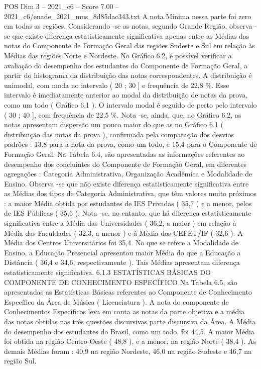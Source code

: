 \begin{textsample}{POS Dim 3 – 2021\_c6 – Score 7.00 – 2021\_c6/enade\_2021\_mus\_8d85dac343.txt}
A nota Mínima nessa parte foi zero em todas as regiões.
Considerando -se as notas, segundo Grande Região, observa -se que existe diferença estatisticamente significativa apenas entre as Médias das notas do Componente de Formação Geral das regiões Sudeste e Sul em relação às Médias das regiões Norte e Nordeste.
No Gráfico 6.2, é possível verificar a avaliação do desempenho dos estudantes do Componente de Formação Geral, a partir do histograma da distribuição das notas correspondentes.
A distribuição é unimodal, com moda no intervalo ( 20 ; 30 ] e frequência de 22,8 \%.
Esse intervalo é imediatamente anterior ao modal da distribuição de notas da prova, como um todo ( Gráfico 6.1 ).
O intervalo modal é seguido de perto pelo intervalo ( 30 ; 40 ], com frequência de 22,5 \%.
Nota -se, ainda, que, no Gráfico 6.2, as notas apresentam dispersão um pouco maior do que as no Gráfico 6.1 ( distribuição das notas da prova ), confirmada pela comparação dos desvios padrões : 13,8 para a nota da prova, como um todo, e 15,4 para o Componente de Formação Geral.
Na Tabela 6.4, são apresentadas as informações referentes ao desempenho dos concluintes do Componente de Formação Geral, em diferentes agregações : Categoria Administrativa, Organização Acadêmica e Modalidade de Ensino.
Observa -se que não existe diferença estatisticamente significativa entre as Médias dos tipos de Categoria Administrativa, que têm valores muito próximos : a maior Média obtida por estudantes de IES Privadas ( 35,7 ) e a menor, pelos de IES Públicas ( 35,6 ).
Nota -se, no entanto, que há diferença estatisticamente significativa entre a Média das Universidades ( 36,2, a maior ) em relação à Média das Faculdades ( 32,3, a menor ) e à Média dos CEFET/IF ( 32,6 ).
A Média dos Centros Universitários foi 35,4.
No que se refere a Modalidade de Ensino, a Educação Presencial apresentou maior Média do que a Educação a Distância ( 36,4 e 34,6, respectivamente ).
Tais Médias apresentam diferença estatisticamente significativa. 6.1.3 ESTATÍSTICAS BÁSICAS DO COMPONENTE DE CONHECIMENTO ESPECÍFICO Na Tabela 6.5, são apresentadas as Estatísticas Básicas referentes ao Componente de Conhecimento Específico da Área de Música ( Licenciatura ).
A nota do componente de Conhecimentos Específicos leva em conta as notas da parte objetiva e a média das notas obtidas nas três questões discursivas parte discursiva da Área.
A Média do desempenho dos estudantes do Brasil, como um todo, foi 44,5.
A maior Média foi obtida na região Centro-Oeste ( 48,8 ), e a menor, na região Norte ( 38,4 ).
As demais Médias foram : 40,9 na região Nordeste, 46,0 na região Sudeste e 46,7 na região Sul.

\end{textsample}
